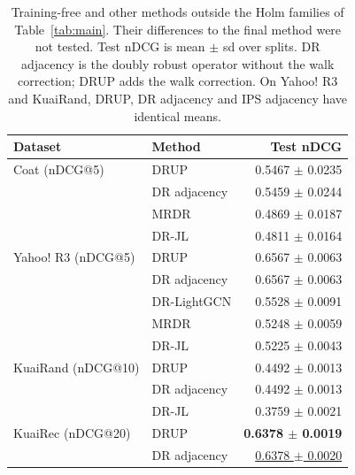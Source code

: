 \begin{table}[t]
\centering
\caption{Training-free and other methods outside the Holm families of Table~\ref{tab:main}. Their differences
to the final method were not tested. Test nDCG is mean $\pm$ sd over splits. DR adjacency is the doubly robust
operator without the walk correction; DRUP adds the walk correction. On Yahoo! R3 and KuaiRand, DRUP, DR adjacency and
IPS adjacency have identical means.}
\label{tab:extra}
\small
\begin{tabular}{@{}llr@{}}
\toprule
Dataset & Method & Test nDCG \\
\midrule
Coat (nDCG@5) & DRUP & 0.5467 $\pm$ 0.0235 \\
 & DR adjacency & 0.5459 $\pm$ 0.0244 \\
 & MRDR & 0.4869 $\pm$ 0.0187 \\
 & DR-JL & 0.4811 $\pm$ 0.0164 \\
\midrule
Yahoo! R3 (nDCG@5) & DRUP & 0.6567 $\pm$ 0.0063 \\
 & DR adjacency & 0.6567 $\pm$ 0.0063 \\
 & DR-LightGCN & 0.5528 $\pm$ 0.0091 \\
 & MRDR & 0.5248 $\pm$ 0.0059 \\
 & DR-JL & 0.5225 $\pm$ 0.0043 \\
\midrule
KuaiRand (nDCG@10) & DRUP & 0.4492 $\pm$ 0.0013 \\
 & DR adjacency & 0.4492 $\pm$ 0.0013 \\
 & DR-JL & 0.3759 $\pm$ 0.0021 \\
\midrule
KuaiRec (nDCG@20) & DRUP & \textbf{0.6378 $\pm$ 0.0019} \\
 & DR adjacency & \underline{0.6378 $\pm$ 0.0020} \\
\bottomrule
\end{tabular}
\end{table}
